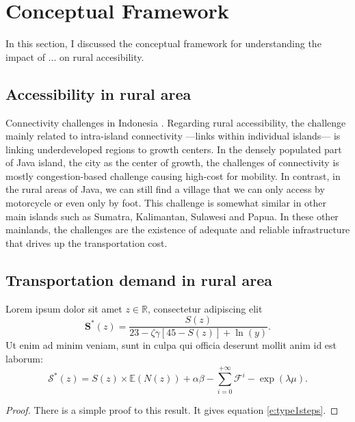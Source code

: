 \documentclass[letterpaper,12pt,leqno]{article}
\begin{document}
\section{Conceptual Framework}\label{s:framework}

In this section, I discussed the conceptual framework for understanding the impact of ... on rural accesibility.

\subsection{Accessibility in rural area}

Connectivity challenges in Indonesia \citep{sandee_2016}. Regarding rural accessibility, the challenge mainly related to intra-island connectivity ---links within individual islands--- is linking underdeveloped regions to growth centers. In the densely populated part of Java island, the city as the center of growth, the challenges of connectivity is mostly congestion-based challenge causing high-cost for mobility. In contrast, in the rural areas of Java, we can still find a village that we can only access by motorcycle or even only by foot. This challenge is somewhat similar in other main islands such as Sumatra, Kalimantan, Sulawesi and Papua. In these other mainlands, the challenges are the existence of adequate and reliable infrastructure that drives up the transportation cost.

\subsection{Transportation demand in rural area} 

\begin{proposition}\label{p:type1}  Lorem ipsum dolor sit amet $z \in \mathbb{R}$, consectetur adipiscing elit
\begin{equation}
\bm{S}^*(z) = \frac{S(z)}{23 -\zeta\gamma [45- S(z)] + \ln(y)}.
\label{e:type1}\end{equation}
Ut enim ad minim veniam, sunt in culpa qui officia deserunt mollit anim id est laborum:
\begin{equation}
\mathcal{S}^*(z) = S(z) \times \mathbb{E}(N(z)) + \alpha \beta - \sum_{i=0}^{+\infty}\mathcal{F}^{i}-\exp(\lambda \mu).
\label{e:type1steps}\end{equation}
\end{proposition}

\begin{proof} There is a simple proof to this result. It gives equation \eqref{e:type1steps}.\end{proof} 
\end{document}
